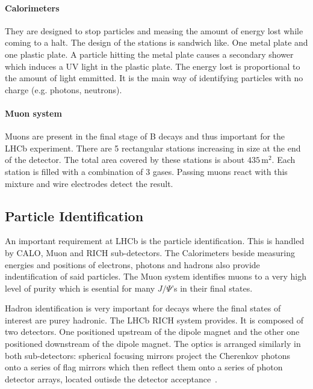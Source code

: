 \documentclass[11pt,twoside]{scrreprt}
\begin{document}
\paragraph{Calorimeters} They are designed to stop particles and measing the amount of energy lost while coming to a halt. The design of the stations is sandwich like. One metal plate and one plastic plate. A particle hitting the metal plate causes a secondary shower which induces a UV light in the plastic plate. The energy lost is proportional to the amount of light emmitted. It is the main way of identifying particles with no charge (e.g. photons, neutrons).

\paragraph{Muon system}
Muons are present in the final stage of B decays and thus important for the LHCb experiment. There are 5 rectangular stations increasing in size at the end of the detector. The total area covered by these stations is about $435$\,m$^2$. Each station is filled with a combination of 3 gases. Passing muons react with this mixture and wire electrodes detect the result.


\subsection{Particle Identification} %
\label{sub:particle_identification}
An important requirement at LHCb is the particle identification. This is handled by CALO, Muon and RICH sub-detectors. The Calorimeters beside measuring energies and positions of electrons, photons and hadrons also provide indentification of said particles. The Muon system identifies muons to a very high level of purity which is esential for many \(J/\Psi\)'s in their final states.

Hadron identification is very important for decays where the final states of interest are purey hadronic. The LHCb RICH system provides. It is composed of two detectors. One positioned upstream of the dipole magnet and the other one positioned downstream of the dipole magnet. The optics is arranged similarly in both sub-detectors: spherical focusing mirrors project the Cherenkov photons onto a series of flag mirrors which then reflect them onto a series of photon detector arrays, located outisde the detector acceptance~\cite{Powell:2011}.
\end{document}
